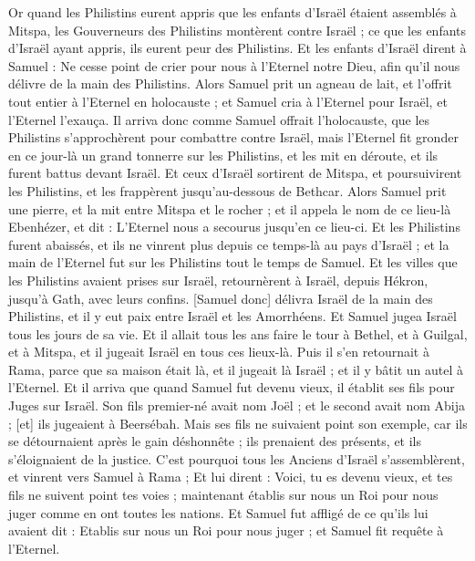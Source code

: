 \begin{multicols}{2}
Or quand les Philistins eurent appris que les enfants d'Israël étaient assemblés à Mitspa, les Gouverneurs des Philistins montèrent contre Israël ; ce que les enfants d'Israël ayant appris, ils eurent peur des Philistins.
Et les enfants d'Israël dirent à Samuel : Ne cesse point de crier pour nous à l'Eternel notre Dieu, afin qu'il nous délivre de la main des Philistins.
Alors Samuel prit un agneau de lait, et l'offrit tout entier à l'Eternel en holocauste ; et Samuel cria à l'Eternel pour Israël, et l'Eternel l'exauça.
Il arriva donc comme Samuel offrait l'holocauste, que les Philistins s'approchèrent pour combattre contre Israël, mais l'Eternel fit gronder en ce jour-là un grand tonnerre sur les Philistins, et les mit en déroute, et ils furent battus devant Israël.
Et ceux d'Israël sortirent de Mitspa, et poursuivirent les Philistins, et les frappèrent jusqu'au-dessous de Bethcar.
Alors Samuel prit une pierre, et la mit entre Mitspa et le rocher ; et il appela le nom de ce lieu-là Ebenhézer, et dit : L'Eternel nous a secourus jusqu'en ce lieu-ci.
Et les Philistins furent abaissés, et ils ne vinrent plus depuis ce temps-là au pays d'Israël ; et la main de l'Eternel fut sur les Philistins tout le temps de Samuel.
Et les villes que les Philistins avaient prises sur Israël, retournèrent à Israël, depuis Hékron, jusqu'à Gath, avec leurs confins. [Samuel donc] délivra Israël de la main des Philistins, et il y eut paix entre Israël et les Amorrhéens.
Et Samuel jugea Israël tous les jours de sa vie.
Et il allait tous les ans faire le tour à Bethel, et à Guilgal, et à Mitspa, et il jugeait Israël en tous ces lieux-là.
Puis il s'en retournait à Rama, parce que sa maison était là, et il jugeait là Israël ; et il y bâtit un autel à l'Eternel.
\VerseOne{}Et il arriva que quand Samuel fut devenu vieux, il établit ses fils pour Juges sur Israël.
Son fils premier-né avait nom Joël ; et le second avait nom Abija ; [et] ils jugeaient à Beersébah.
Mais ses fils ne suivaient point son exemple, car ils se détournaient après le gain déshonnête ; ils prenaient des présents, et ils s'éloignaient de la justice.
C'est pourquoi tous les Anciens d'Israël s'assemblèrent, et vinrent vers Samuel à Rama ;
Et lui dirent : Voici, tu es devenu vieux, et tes fils ne suivent point tes voies ; maintenant établis sur nous un Roi pour nous juger comme en ont toutes les nations.
Et Samuel fut affligé de ce qu'ils lui avaient dit : Etablis sur nous un Roi pour nous juger ; et Samuel fit requête à l'Eternel.

\end{multicols}
